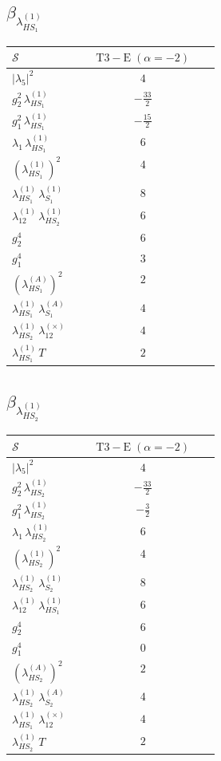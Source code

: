 \documentclass[9pt]{article}
\begin{document}
\subsection*{$ \beta_{\lambda_{HS_1}^{(1)}} $}
\begin{longtable}{@{}p{0.31\linewidth}c@{}}
\toprule
$\mathcal{S}$ & $ \mathrm{T3-E}\;(\alpha=-2) $ \\
\midrule
$ |\lambda_5|^2 $ & $ 4 $ \\
$ g_2^2\,\lambda_{HS_1}^{(1)} $ & $ - \frac{33}{2} $ \\
$ g_1^2\,\lambda_{HS_1}^{(1)} $ & $ - \frac{15}{2} $ \\
$ \lambda_1\,\lambda_{HS_1}^{(1)} $ & $ 6 $ \\
$ \left(\lambda_{HS_1}^{(1)}\right)^2 $ & $ 4 $ \\
$ \lambda_{HS_1}^{(1)}\,\lambda_{S_1}^{(1)} $ & $ 8 $ \\
$ \lambda_{12}^{(1)}\,\lambda_{HS_2}^{(1)} $ & $ 6 $ \\
$ g_2^4 $ & $ 6 $ \\
$ g_1^4 $ & $ 3 $ \\
$ \left(\lambda_{HS_1}^{(A)}\right)^2 $ & $ 2 $ \\
$ \lambda_{HS_1}^{(1)}\,\lambda_{S_1}^{(A)} $ & $ 4 $ \\
$ \lambda_{HS_2}^{(1)}\,\lambda_{12}^{(\times)} $ & $ 4 $ \\
$ \lambda_{HS_1}^{(1)}\,T $ & $ 2 $ \\
\bottomrule
\end{longtable}
\subsection*{$ \beta_{\lambda_{HS_2}^{(1)}} $}
\begin{longtable}{@{}p{0.31\linewidth}c@{}}
\toprule
$\mathcal{S}$ & $ \mathrm{T3-E}\;(\alpha=-2) $ \\
\midrule
$ |\lambda_5|^2 $ & $ 4 $ \\
$ g_2^2\,\lambda_{HS_2}^{(1)} $ & $ - \frac{33}{2} $ \\
$ g_1^2\,\lambda_{HS_2}^{(1)} $ & $ - \frac{3}{2} $ \\
$ \lambda_1\,\lambda_{HS_2}^{(1)} $ & $ 6 $ \\
$ \left(\lambda_{HS_2}^{(1)}\right)^2 $ & $ 4 $ \\
$ \lambda_{HS_2}^{(1)}\,\lambda_{S_2}^{(1)} $ & $ 8 $ \\
$ \lambda_{12}^{(1)}\,\lambda_{HS_1}^{(1)} $ & $ 6 $ \\
$ g_2^4 $ & $ 6 $ \\
$ g_1^4 $ & $ 0 $ \\
$ \left(\lambda_{HS_2}^{(A)}\right)^2 $ & $ 2 $ \\
$ \lambda_{HS_2}^{(1)}\,\lambda_{S_2}^{(A)} $ & $ 4 $ \\
$ \lambda_{HS_1}^{(1)}\,\lambda_{12}^{(\times)} $ & $ 4 $ \\
$ \lambda_{HS_2}^{(1)}\,T $ & $ 2 $ \\
\bottomrule
\end{longtable}
\end{document}
